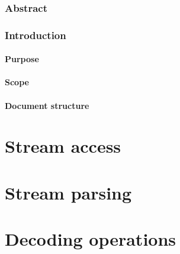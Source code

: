 

\section{Abstract}
\section{Introduction}
\subsection{Purpose}
\subsection{Scope}
\subsection{Document structure}

\clearpage
\part{Stream access}
\clearpage
\part{Stream parsing}
\clearpage
\part{Decoding operations}



